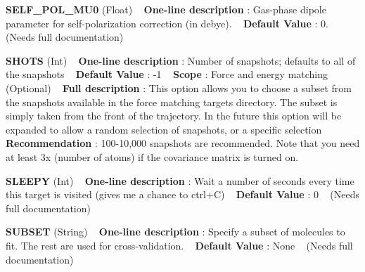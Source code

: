 \begin{DoxyItemize}
\item {\bfseries  S\+E\+L\+F\+\_\+\+P\+O\+L\+\_\+\+M\+U0 } (Float) ~\newline
{\bfseries  One-\/line description }\+: Gas-\/phase dipole parameter for self-\/polarization correction (in debye). ~\newline
{\bfseries  Default Value }\+: 0. ~\newline
(Needs full documentation)\end{DoxyItemize}
\begin{DoxyItemize}
\item {\bfseries  S\+H\+O\+TS } (Int) ~\newline
{\bfseries  One-\/line description }\+: Number of snapshots; defaults to all of the snapshots ~\newline
{\bfseries  Default Value }\+: -\/1 ~\newline
{\bfseries  Scope }\+: Force and energy matching (Optional) ~\newline
{\bfseries  Full description }\+: This option allows you to choose a subset from the snapshots available in the force matching \textquotesingle{}targets\textquotesingle{} directory. The subset is simply taken from the front of the trajectory. In the future this option will be expanded to allow a random selection of snapshots, or a specific selection ~\newline
{\bfseries  Recommendation }\+: 100-\/10,000 snapshots are recommended. Note that you need at least 3x (number of atoms) if the covariance matrix is turned on.\end{DoxyItemize}
\begin{DoxyItemize}
\item {\bfseries  S\+L\+E\+E\+PY } (Int) ~\newline
{\bfseries  One-\/line description }\+: Wait a number of seconds every time this target is visited (gives me a chance to ctrl+C) ~\newline
{\bfseries  Default Value }\+: 0 ~\newline
(Needs full documentation)\end{DoxyItemize}
\begin{DoxyItemize}
\item {\bfseries  S\+U\+B\+S\+ET } (String) ~\newline
{\bfseries  One-\/line description }\+: Specify a subset of molecules to fit. The rest are used for cross-\/validation. ~\newline
{\bfseries  Default Value }\+: None ~\newline
(Needs full documentation)\end{DoxyItemize}
